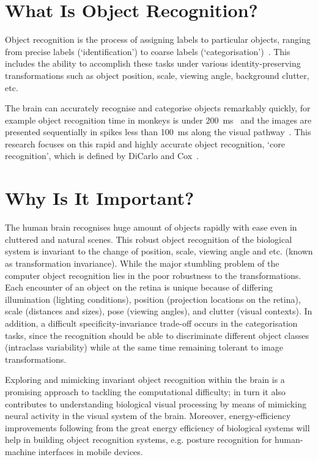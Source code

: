 \section{What Is Object Recognition?}
\label{sec:aim}
Object recognition is the process of assigning labels to particular objects, ranging from precise labels (`identification') to coarse labels (`categorisation')~\cite{dicarlo2012does}.
This includes the ability to accomplish these tasks under various identity-preserving transformations such as object position, scale, viewing angle, background clutter, etc.

The brain can accurately recognise and categorise objects remarkably quickly, for example object recognition time in monkeys is under 200~ms~\cite{fabre1998rapid} and the images are presented sequentially in spikes less than 100~ms along the visual pathway~\cite{keysers2001speed}.
This research focuses on this rapid and highly accurate object recognition, `core recognition', which is defined by DiCarlo and Cox~\cite{dicarlo2007untangling}.


\section{Why Is It Important?}
\label{sec:imp}
The human brain recognises huge amount of objects rapidly with ease even in cluttered and natural scenes.
This robust object recognition of the biological system is invariant to the change of position, scale, viewing angle and etc. (known as transformation invariance).
While the major stumbling problem of the computer object recognition lies in the poor robustness to the transformations.
Each encounter of an object on the retina is unique because of differing illumination (lighting conditions), position (projection locations on the retina), scale (distances and sizes), pose (viewing angles), and clutter (visual contexts).
In addition, a difficult specificity-invariance trade-off occurs in the categorisation tasks, since the recognition should be able to discriminate different object classes (intraclass variability) while at the same time remaining tolerant to image transformations.   

Exploring and mimicking invariant object recognition within the brain is a promising approach to tackling the computational difficulty;
in turn it also contributes to understanding biological visual processing by means of mimicking neural activity in the visual system of the brain.
Moreover, energy-efficiency improvements following from the great energy efficiency of biological systems will help in building object recognition systems, e.g. posture recognition for human-machine interfaces in mobile devices.  

